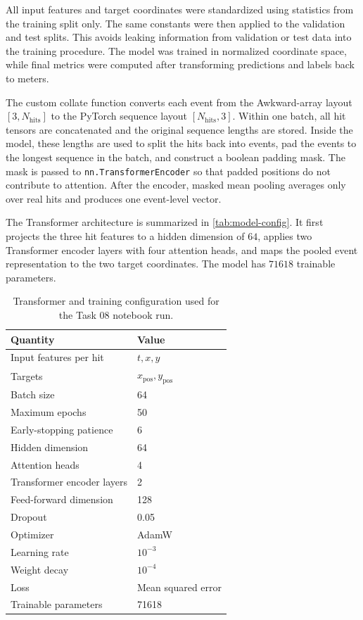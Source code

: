 All input features and target coordinates were standardized using statistics from the training split only.
The same constants were then applied to the validation and test splits.
This avoids leaking information from validation or test data into the training procedure.
The model was trained in normalized coordinate space, while final metrics were computed after transforming predictions and labels back to meters.

The custom collate function converts each event from the Awkward-array layout \([3, N_{\mathrm{hits}}]\) to the PyTorch sequence layout \([N_{\mathrm{hits}}, 3]\).
Within one batch, all hit tensors are concatenated and the original sequence lengths are stored.
Inside the model, these lengths are used to split the hits back into events, pad the events to the longest sequence in the batch, and construct a boolean padding mask.
The mask is passed to \texttt{nn.TransformerEncoder} so that padded positions do not contribute to attention.
After the encoder, masked mean pooling averages only over real hits and produces one event-level vector.

The Transformer architecture is summarized in \autoref{tab:model-config}.
It first projects the three hit features to a hidden dimension of \(64\), applies two Transformer encoder layers with four attention heads, and maps the pooled event representation to the two target coordinates.
The model has \(71618\) trainable parameters.

\begin{table}[H]
    \centering
    \begin{tabular}{ll}
        \toprule
        Quantity & Value \\
        \midrule
        Input features per hit & \(t, x, y\) \\
        Targets & \(x_{\mathrm{pos}}, y_{\mathrm{pos}}\) \\
        Batch size & 64 \\
        Maximum epochs & 50 \\
        Early-stopping patience & 6 \\
        Hidden dimension & 64 \\
        Attention heads & 4 \\
        Transformer encoder layers & 2 \\
        Feed-forward dimension & 128 \\
        Dropout & 0.05 \\
        Optimizer & AdamW \\
        Learning rate & \(10^{-3}\) \\
        Weight decay & \(10^{-4}\) \\
        Loss & Mean squared error \\
        Trainable parameters & 71618 \\
        \bottomrule
    \end{tabular}
    \caption{Transformer and training configuration used for the Task 08 notebook run.}
    \label{tab:model-config}
\end{table}

